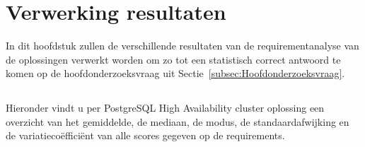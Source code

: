 
\chapter{Verwerking resultaten}
\label{ch:Verwerking resultaten}

In dit hoofdstuk zullen de verschillende resultaten van de requirementanalyse van de oplossingen verwerkt worden om zo tot een statistisch correct antwoord te komen op de hoofdonderzoeksvraag uit Sectie~\ref{subsec:Hoofdonderzoeksvraag}.

\section{}
\label{sec:Resultaten requirements}



Hieronder vindt u per PostgreSQL High Availability cluster oplossing een overzicht van het gemiddelde, de mediaan, de modus, de standaardafwijking en de variatiecoëfficiënt van alle scores gegeven op de requirements.

